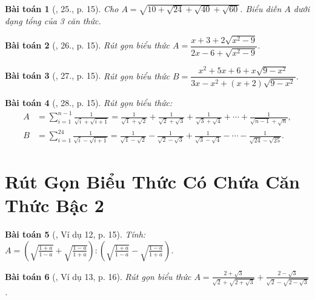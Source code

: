\documentclass{article}
\newtheorem{baitoan}{Bài toán}
\begin{document}
\begin{baitoan}[\cite{Binh_Toan_9_tap_1}, 25., p. 15]
	Cho $A = \sqrt{10 + \sqrt{24} + \sqrt{40} + \sqrt{60}}$. Biểu diễn $A$ dưới dạng tổng của 3 căn thức.
\end{baitoan}

\begin{baitoan}[\cite{Binh_Toan_9_tap_1}, 26., p. 15]
	Rút gọn biểu thức $A = \dfrac{x + 3 + 2\sqrt{x^2 - 9}}{2x - 6 + \sqrt{x^2 - 9}}$.
\end{baitoan}

\begin{baitoan}[\cite{Binh_Toan_9_tap_1}, 27., p. 15]
	Rút gọn biểu thức $B = \dfrac{x^2 + 5x + 6 + x\sqrt{9 - x^2}}{3x - x^2 + (x + 2)\sqrt{9 - x^2}}$.
\end{baitoan}

\begin{baitoan}[\cite{Binh_Toan_9_tap_1}, 28., p. 15]
	Rút gọn biểu thức:
	\begin{align*}
		A &= \sum_{i=1}^{n-1} \frac{1}{\sqrt{i} + \sqrt{i + 1}} = \frac{1}{\sqrt{1} + \sqrt{2}} + \frac{1}{\sqrt{2} + \sqrt{3}} + \frac{1}{\sqrt{3} + \sqrt{4}} + \cdots + \frac{1}{\sqrt{n - 1} + \sqrt{n}},\\
		B &= \sum_{i=1}^{24} \frac{1}{\sqrt{i} - \sqrt{i + 1}} = \frac{1}{\sqrt{1} - \sqrt{2}} - \frac{1}{\sqrt{2} - \sqrt{3}} + \frac{1}{\sqrt{3} - \sqrt{4}} - \cdots - \frac{1}{\sqrt{24} - \sqrt{25}}.
	\end{align*}
\end{baitoan}


\section{Rút Gọn Biểu Thức Có Chứa Căn Thức Bậc 2}

\begin{baitoan}[\cite{Binh_Toan_9_tap_1}, Ví dụ 12, p. 15]
	Tính: $A = \left(\sqrt{\frac{1 + a}{1 - a}} + \sqrt{\frac{1 - a}{1 + a}}\right):\left(\sqrt{\frac{1 + a}{1 - a}} - \sqrt{\frac{1 - a}{1 + a}}\right)$.
\end{baitoan}

\begin{baitoan}[\cite{Binh_Toan_9_tap_1}, Ví dụ 13, p. 16]
	Rút gọn biểu thức $A = \frac{2 + \sqrt{3}}{\sqrt{2} + \sqrt{2 + \sqrt{3}}} + \frac{2 - \sqrt{3}}{\sqrt{2} - \sqrt{2 - \sqrt{3}}}$.
\end{baitoan}
\end{document}

